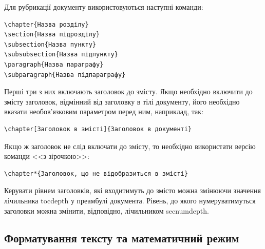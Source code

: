 Для рубрикації документу використовуються наступні команди:
\begin{verbatim}
\chapter{Назва розділу}
\section{Назва підрозділу}
\subsection{Назва пункту}
\subsubsection{Назва підпункту}
\paragraph{Назва параграфу}
\subparagraph{Назва підпараграфу}
\end{verbatim}

Перші три з них включають заголовок до змісту. Якщо необхідно включити до змісту заголовок, відмінний від заголовку в тілі документу, його необхідно вказати необов'язковим параметром перед ним, наприклад, так:
\begin{verbatim}
\chapter[Заголовок в змісті]{Заголовок в документі}
\end{verbatim}

Якщо ж заголовок не слід включати до змісту, то необхідно використати версію команди <<з зірочкою>>:
\begin{verbatim}
\chapter*{Заголовок, що не відобразиться в змісті}
\end{verbatim}

Керувати рівнем заголовків, які входитимуть до змісто можна змінюючи значення лічильника tocdepth у преамбулі документа. Рівень, до якого нумеруватимуться заголовки можна змінити, відповідно, лічильником secnumdepth.

\subsection{Форматування тексту та математичний режим}

